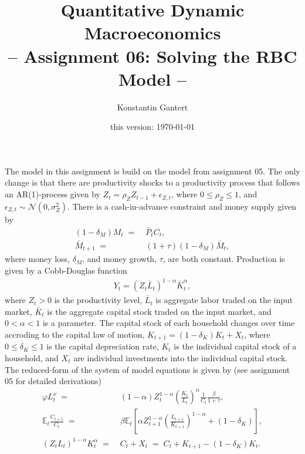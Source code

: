 \documentclass[a4paper, 12pt]{article}
\title{Quantitative Dynamic Macroeconomics \vspace{0.1in} \\ \large{-- Assignment 06: Solving the RBC Model --}}
\author{\small{Konstantin Gantert}}
\date{\small{this version: \today}}
\begin{document}
%
\clearpage\maketitle%
The model in this assignment is build on the model from assignment 05. The only change is that there are productivity shocks to a productivity process that follows an AR(1)-process given by $Z_t = \rho_Z Z_{t-1} + \epsilon_{Z,t}$, where $0 \leq \rho_Z \leq 1$, and $\epsilon_{Z,t} \sim \mathcal{N} \left(0,\sigma_Z^2\right)$. There is a cash-in-advance constraint and money supply given by%
\begin{align*}%
	(1-\delta_M) M_t \; = & \; \bar{P}_t C_t,\\%
	\bar{M}_{t+1} \; = & \; (1+\tau)(1-\delta_M) \bar{M}_t,%
\end{align*}%
where money loss, $\delta_M$, and money growth, $\tau$, are both constant. Production is given by a Cobb-Douglas function
\begin{align*}%
	Y_t = \left(Z_t \bar{L}_t\right)^{1-\alpha} \bar{K}_t^{\alpha},%
\end{align*}%
where $Z_t > 0$ is the productivity level, $\bar{L}_t$ is aggregate labor traded on the input market, $\bar{K}_t$ is the aggregate capital stock traded on the input market, and $0<\alpha<1$ is a parameter. The capital stock of each household changes over time accroding to the capital law of motion, $K_{t+1} = (1-\delta_K) K_t + X_t$, where $0 \leq\delta_K\leq 1$ is the capital depreciation rate, $K_t$ is the individual capital stock of a household, and $X_t$ are individual investments into the individual capital stock. The reduced-form of the system of model equations is given by (see assignment 05 for detailed derivations)%
\begin{align}%
	\varphi L_t^\nu \; = & \; (1-\alpha) Z_t^{1-\alpha} \left(\frac{K_t}{L_t}\right)^\alpha \frac{1}{C_t} \frac{\beta}{1+\tau},\label{eq:labor_equilibrium}\\%
	\mathbb{E}_t \frac{C_{t+1}}{C_t} \; = & \; \beta \mathbb{E}_t \left[ \alpha Z_{t+1}^{1-\alpha} \left(\frac{L_{t+1}}{K_{t+1}}\right)^{1-\alpha} + (1-\delta_K) \right],\label{eq:capital_equilibrium}\\%
	\left(Z_t L_t\right)^{1-\alpha} K_t^\alpha \; = & \; C_t + X_t \; = \; C_t + K_{t+1} - (1-\delta_K) K_t.\label{eq:consumption_equilibrium}%
\end{align}%
\end{document}
